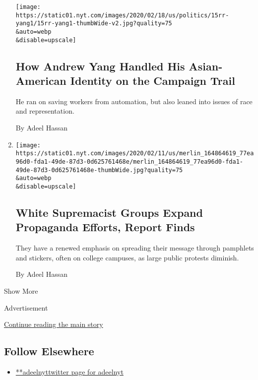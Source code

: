 \begin{enumerate}
  \texttt{[image: https://static01.nyt.com/images/2020/02/18/us/politics/15rr-yang1/15rr-yang1-thumbWide-v2.jpg?quality=75\\\&auto=webp\\\&disable=upscale]}

  \hypertarget{how-andrew-yang-handled-his-asian-american-identity-on-the-campaign-trail}{%
  \subsection{How Andrew Yang Handled His Asian-American Identity on the
  Campaign
  Trail}\label{how-andrew-yang-handled-his-asian-american-identity-on-the-campaign-trail}}

  He ran on saving workers from automation, but also leaned into issues
  of race and representation.

  By Adeel Hassan
\item
  \href{/2020/02/12/us/white-supremacist-propaganda-campus.html}{}

  \texttt{[image: https://static01.nyt.com/images/2020/02/11/us/merlin\_164864619\_77ea96d0-fda1-49de-87d3-0d625761468e/merlin\_164864619\_77ea96d0-fda1-49de-87d3-0d625761468e-thumbWide.jpg?quality=75\\\&auto=webp\\\&disable=upscale]}

  \hypertarget{white-supremacist-groups-expand-propaganda-efforts-report-finds}{%
  \subsection{White Supremacist Groups Expand Propaganda Efforts, Report
  Finds}\label{white-supremacist-groups-expand-propaganda-efforts-report-finds}}

  They have a renewed emphasis on spreading their message through
  pamphlets and stickers, often on college campuses, as large public
  protests diminish.

  By Adeel Hassan
\end{enumerate}

Show More

Advertisement

\protect\hyperlink{after-mid2}{Continue reading the main story}

\hypertarget{follow-elsewhere}{%
\subsection{Follow Elsewhere}\label{follow-elsewhere}}

\begin{itemize}
\tightlist
\item
  \href{https://twitter.com/adeelnyt}{**adeelnyttwitter page for
  adeelnyt}
\end{itemize}

